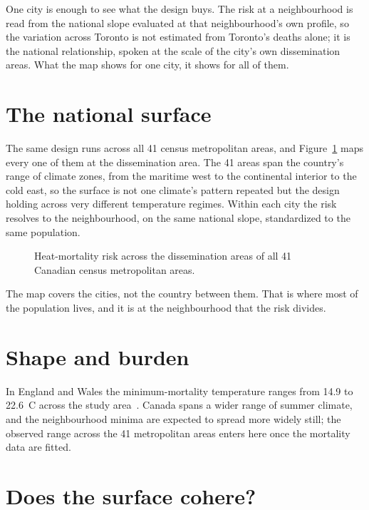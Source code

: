 One city is enough to see what the design buys. The risk at a neighbourhood is read from the national slope evaluated at that neighbourhood's own profile, so the variation across Toronto is not estimated from Toronto's deaths alone; it is the national relationship, spoken at the scale of the city's own dissemination areas. What the map shows for one city, it shows for all of them.

\section{The national surface}

The same design runs across all 41 census metropolitan areas, and Figure~\ref{fig:national} maps every one of them at the dissemination area. The 41 areas span the country's range of climate zones, from the maritime west to the continental interior to the cold east, so the surface is not one climate's pattern repeated but the design holding across very different temperature regimes. Within each city the risk resolves to the neighbourhood, on the same national slope, standardized to the same population.

\begin{figure}[ht]
\centering
\caption{Heat-mortality risk across the dissemination areas of all 41 Canadian census metropolitan areas.}
\label{fig:national}
\end{figure}

The map covers the cities, not the country between them. That is where most of the population lives, and it is at the neighbourhood that the risk divides.

\section{Shape and burden}

In England and Wales the minimum-mortality temperature ranges from 14.9 to 22.6~\textdegree C across the study area~\citep{gasparrini2022smallarea}. Canada spans a wider range of summer climate, and the neighbourhood minima are expected to spread more widely still; the observed range across the 41 metropolitan areas enters here once the mortality data are fitted.

\section{Does the surface cohere?}

